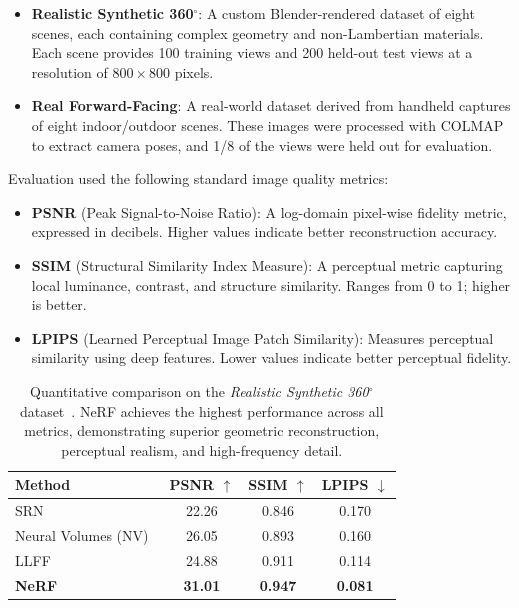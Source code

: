 \begin{itemize}
    \item \textbf{Realistic Synthetic 360$^\circ$}: A custom Blender-rendered dataset of eight scenes, each containing complex geometry and non-Lambertian materials. Each scene provides 100 training views and 200 held-out test views at a resolution of $800 \times 800$ pixels.
    \item \textbf{Real Forward-Facing}: A real-world dataset derived from handheld captures of eight indoor/outdoor scenes. These images were processed with COLMAP to extract camera poses, and 1/8 of the views were held out for evaluation.
\end{itemize}

\noindent
Evaluation used the following standard image quality metrics:

\begin{itemize}
    \item \textbf{PSNR} (Peak Signal-to-Noise Ratio): A log-domain pixel-wise fidelity metric, expressed in decibels. Higher values indicate better reconstruction accuracy.
    \item \textbf{SSIM} (Structural Similarity Index Measure): A perceptual metric capturing local luminance, contrast, and structure similarity. Ranges from 0 to 1; higher is better.
    \item \textbf{LPIPS} (Learned Perceptual Image Patch Similarity): Measures perceptual similarity using deep features. Lower values indicate better perceptual fidelity.
\end{itemize}

\begin{table}[H]
    \centering
    \begin{tabular}{lccc}
        \toprule
        \textbf{Method} & \textbf{PSNR} $\uparrow$ & \textbf{SSIM} $\uparrow$ & \textbf{LPIPS} $\downarrow$ \\
        \midrule
        SRN~\cite{sitzmann2019_srn} & 22.26 & 0.846 & 0.170 \\
        Neural Volumes (NV)~\cite{lombardi2019_neuralvolumes} & 26.05 & 0.893 & 0.160 \\
        LLFF~\cite{mildenhall2019_llff} & 24.88 & 0.911 & 0.114 \\
        \textbf{NeRF}~\cite{mildenhall2020_nerf} & \textbf{31.01} & \textbf{0.947} & \textbf{0.081} \\
        \bottomrule
    \end{tabular}
    \caption{Quantitative comparison on the \emph{Realistic Synthetic 360$^\circ$} dataset~\cite{mildenhall2020_nerf}. NeRF achieves the highest performance across all metrics, demonstrating superior geometric reconstruction, perceptual realism, and high-frequency detail.}
    \label{tab:chapter23_nerf_quantitative}
\end{table}

